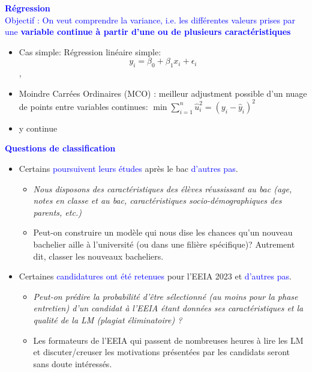 \documentclass[12pt,aspectratio=1610]{beamer}
\begin{document}
\begin{frame}
	\textcolor{blue}{\textbf{\large Régression}  \\
	Objectif : On veut comprendre la variance, i.e. les différentes valeurs prises par une \textbf{variable continue à partir d'une ou de plusieurs caractéristiques}} 
	\vspace{0.5 cm}
	\begin{itemize}
		\item Cas simple: Régression linéaire simple: 	$$ y_i=\beta_0+\beta_1x_i+\epsilon_i $$, 
		
		\item Moindre Carrées Ordinaires (MCO) : meilleur adjustment possible d'un nuage de points entre variables continues: $\displaystyle\min  
		\sum_{i=1}^{n}\hat{u}^2_i=(y_i-\hat{y}_i)^2$
		\item y continue 
	\end{itemize}
\end{frame}




\begin{frame}
		\textcolor{blue}{\textbf{\large Questions de classification}}
	\begin{itemize}
		\item<1-> Certains 	\textcolor{blue}{poursuivent leurs études} après le bac \textcolor{blue}{d'autres pas}. 
		\begin{itemize}
			\item <1->	\textit{Nous disposons des caractéristiques des élèves réussissant au bac  (age, notes en classe et au bac, caractéristiques socio-démographiques des parents, etc.)}
			
			\item<2-> Peut-on construire un modèle qui nous dise les chances qu'un nouveau bachelier aille à l'université (ou dans  une filière spécifique)? Autrement dit, classer les nouveaux bacheliers.
			
		\end{itemize}
		
		\vspace{0.5cm}
		
		
		\item <3-> Certaines 	\textcolor{blue}{candidatures ont été retenues} pour l'EEIA 2023 et 	\textcolor{blue}{ d'autres pas}.
		
		\begin{itemize}
			\item \textit{Peut-on prédire la probabilité d'être sélectionné (au moins pour la phase entretien) d'un candidat à l'EEIA 	étant données ses caractéristiques  et la qualité de la LM (plagiat éliminatoire) ?}  
			
			\item Les formateurs  de l'EEIA qui passent de nombreuses heures à lire les LM et discuter/creuser les motivations présentées par les candidats  seront sans doute intéressés.
			
		\end{itemize}
		
		
	\end{itemize}
	
\end{frame}
\end{document}
